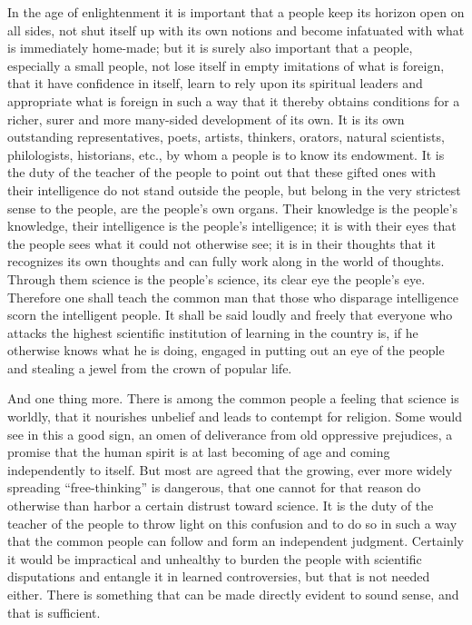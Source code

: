 \documentclass[12pt,a4paper,openany]{book}
\newcommand{\opage}[1]{\marginnote{\footnotesize\textit{[#1]}}}
\begin{document}
In the age of enlightenment it is important that
a people keep its horizon open on all sides, not
shut itself up with its own notions and
become infatuated with what is immediately home-made; but it is
surely also important that a people, especially a small
people, not lose itself in empty imitations of what is
foreign, that it have confidence in itself, learn to
rely upon its spiritual leaders and appropriate what is
foreign in such a way that it thereby obtains conditions
for a richer, surer and more many-sided development of its
own. It is its own outstanding representatives,
poets, artists, thinkers, orators, natural scientists,
philologists, historians, etc., by whom a people
is to know its endowment. It is the duty of the teacher of the people
to point out that these gifted ones with their
intelligence do not stand outside the people, but belong in the very strictest
sense to the people, are the people's own organs.
Their knowledge is the people's knowledge, their intelligence
is the people's intelligence; it is with their eyes that the people
sees what it could not otherwise see; it is in
\setcounter{footnote}{0}%
\opage{131}their thoughts that it recognizes its own thoughts and
can fully work along in the world of thoughts. Through
them science is the people's science, its clear
eye the people's eye. Therefore one shall teach the common
man that those who disparage intelligence scorn
the intelligent people. It shall be said loudly and freely that everyone
who attacks the highest scientific institution of learning
in the country is, if he otherwise knows what he
is doing, engaged in putting out an eye of the people and
stealing a jewel from the crown of popular life.

And one thing more. There is among the common people a
feeling that science is worldly, that it nourishes
unbelief and leads to contempt for religion. Some
would see in this a good sign, an omen of deliverance from
old oppressive prejudices, a promise that
the human spirit is at last becoming of age and coming
independently to itself. But most are agreed
that the growing, ever more widely spreading ``free-thinking''
is dangerous, that one cannot for that reason do otherwise
than harbor a certain distrust toward science. It is the duty of the teacher of the people
to throw light on this confusion and to do so
in such a way that the common people can follow
and form an independent judgment. Certainly it
would be impractical and unhealthy to burden the people with
scientific disputations and entangle it in learned
controversies, but that is not needed either. There is
something that can be made directly evident to
sound sense, and that is sufficient.
\end{document}
